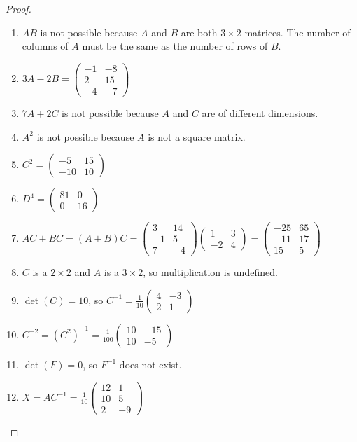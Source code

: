     \begin{proof}
    \vspace{-\topsep}
    \
    \begin{enumerate}
        \item $AB$ is not possible because $A$ and $B$ are both $3\times 2$ matrices. The number of columns of $A$ must be the same as the number of rows of $B$.
        \item $3A-2B = \begin{pmatrix}-1 & -8\\ 2 & 15\\ -4 & -7 \end{pmatrix}$
        \item $7A+2C$ is not possible because $A$ and $C$ are of different dimensions.
        \item $A^2$ is not possible because $A$ is not a square matrix.
        \item $C^2 = \begin{pmatrix} -5 & 15 \\ -10 & 10\end{pmatrix}$
        \item $D^4 = \begin{pmatrix} 81 & 0 \\ 0 & 16\end{pmatrix}$
        \item $AC+BC = (A+B)C = \begin{pmatrix} 3 & 14 \\ -1 & 5 \\ 7 & -4 \end{pmatrix} \begin{pmatrix} 1 & 3 \\ -2 & 4 \end{pmatrix} = \begin{pmatrix} -25 & 65 \\ -11 & 17 \\ 15 & 5 \end{pmatrix}$
        \item $C$ is a $2\times 2$ and $A$ is a $3\times 2$, so multiplication is undefined.
        \item $\det(C) = 10$, so $C^{-1} = \frac{1}{10}\begin{pmatrix} 4 & -3 \\ 2 & 1 \end{pmatrix}$
        \item $C^{-2} = (C^2)^{-1} = \frac{1}{100}\begin{pmatrix}10 & -15 \\ 10 & -5\end{pmatrix}$
        \item $\det(F) = 0$, so $F^{-1}$ does not exist. 
        \item $X = AC^{-1} = \frac{1}{10}\begin{pmatrix}12 & 1\\10 & 5\\ 2 & -9\end{pmatrix}$  
    \end{enumerate}
    \end{proof}
